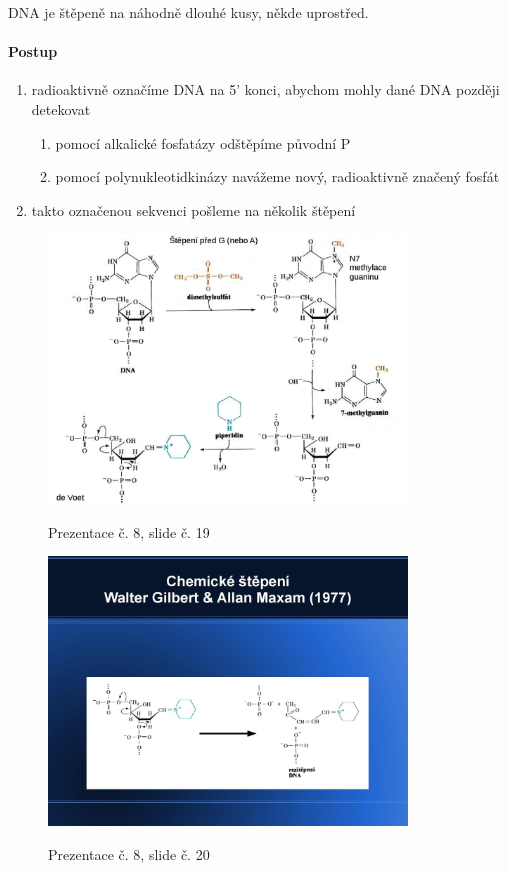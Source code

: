 \documentclass[DIV=8]{scrreprt}
\begin{document}
DNA je štěpeně na náhodně dlouhé kusy, někde uprostřed.

\paragraph{Postup}
\begin{enumerate}[nosep]
    \item radioaktivně označíme DNA na 5' konci, abychom mohly dané DNA později detekovat
\begin{enumerate}[nosep]
    \item pomocí alkalické fosfatázy odštěpíme původní P
    \item pomocí polynukleotidkinázy navážeme nový, radioaktivně značený fosfát
\end{enumerate}

    \item takto označenou sekvenci pošleme na několik štěpení
\end{enumerate}



\begin{figure}
    \caption{Prezentace č. 8, slide č. 19}
    \includegraphics[width=0.85\textwidth]{slides-8/slide-19.jpg}
    \centering
    \label{slides-8-slide-19}
\end{figure}
\begin{figure}
    \caption{Prezentace č. 8, slide č. 20}
    \includegraphics[width=0.85\textwidth]{slides-8/slide-20.jpg}
    \centering
    \label{slides-8-slide-20}
\end{figure}
\end{document}
